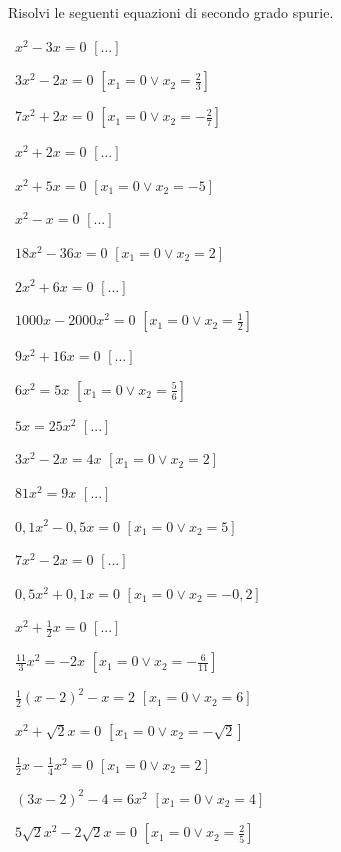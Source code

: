 \begin{esercizio}[\Ast]
\label{ese:3.5}
Risolvi le seguenti equazioni di secondo grado spurie.
\begin{multicols}{2}
 \begin{enumeratea}
 \item~$x^{2} - 3 x = 0$ \hfill$\left[...\right]$
 \item~$3 x^{2} - 2 x = 0$ 
  \hfill$\left[x_{1} = 0 \vee x_{2} = \frac{2}{3}\right]$
 \item~$7 x^{2} + 2 x = 0$ 
  \hfill$\left[x_{1} = 0 \vee x_{2} = - \frac{2}{7}\right]$
 \item~$x^{2} + 2 x = 0$ \hfill$\left[...\right]$
 \item~$x^{2} + 5 x = 0$ 
  \hfill$\left[x_{1} = 0 \vee x_{2} = - 5\right]$
 \item~$x^{2} - x = 0$ \hfill$\left[...\right]$
 \item~$18 x^{2} - 36 x = 0$ \hfill$\left[x_{1} = 0 \vee x_{2} = 2\right]$
 \item~$2x^{2} + 6x = 0$ \hfill$\left[...\right]$
 \item~$1000 x - 2000 x^{2} = 0$ \hfill$\left[x_{1} = 0 \vee x_{2} = \frac{1}{2}\right]$
 \item~$9x^{2} + 16x = 0$ \hfill$\left[...\right]$
 \item~$6 x^{2} = 5 x$ \hfill$\left[x_{1} = 0 \vee x_{2} = \frac{5}{6}\right]$
 \item~$5x = 25x^{2}$ \hfill$\left[...\right]$
 \item~$3 x^{2} - 2 x = 4 x$ \hfill$\left[x_{1} = 0 \vee x_{2} = 2\right]$
 \item~$81x^{2} = 9x$ \hfill$\left[...\right]$
 \item~$0,1 x^{2} - 0,5 x = 0$ \hfill$\left[x_{1} = 0 \vee x_{2} = 5\right]$
 \item~$7x^{2} - 2x = 0$ \hfill$\left[...\right]$
 \item~$0,5 x^{2} + 0,1 x = 0$ \hfill$\left[x_{1} = 0 \vee x_{2} = - 0,2\right]$
 \item~$x^{2} + \frac{1}{2} x = 0$ \hfill$\left[...\right]$
 \item~$\frac{11}{3} x^{2} = - 2 x$ 
  \hfill$\left[x_{1} = 0 \vee x_{2} = - \frac{6}{11}\right]$
 \item~$\frac{1}{2} ( x - 2 )^{2} - x = 2$
  \hfill$\left[x_{1} = 0 \vee x_{2} = 6\right]$
 \item~$x^{2} + \sqrt{2} x = 0$ 
  \hfill$\left[x_{1} = 0 \vee x_{2} = - \sqrt{2}\right]$
 \item~$\frac{1}{2} x - \frac{1}{4} x^{2} = 0$ 
  \hfill$\left[x_{1} = 0 \vee x_{2} = 2\right]$
 \item~$(3 x - 2)^{2} - 4 = 6 x^{2}$
  \hfill$\left[x_{1} = 0 \vee x_{2} = 4\right]$
 \item~$5 \sqrt{2} x^{2} - 2 \sqrt{2} x = 0$ 
  \hfill$\left[x_{1} = 0 \vee x_{2} = \frac{2}{5}\right]$
 \end{enumeratea}
 \end{multicols}
\end{esercizio}

